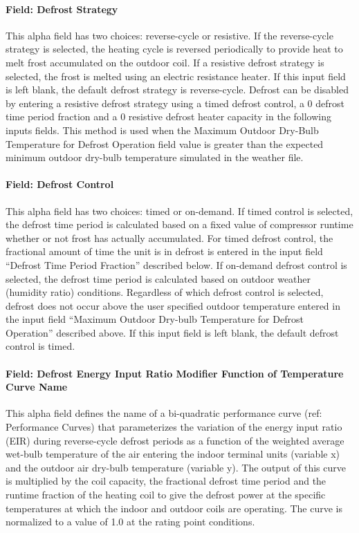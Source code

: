 \paragraph{Field: Defrost Strategy}

This alpha field has two choices: reverse-cycle or resistive. If the reverse-cycle strategy is selected, the heating cycle is reversed periodically to provide heat to melt frost accumulated on the outdoor coil. If a resistive defrost strategy is selected, the frost is melted using an electric resistance heater. If this input field is left blank, the default defrost strategy is reverse-cycle. Defrost can be disabled by entering a resistive defrost strategy using a timed defrost control, a 0 defrost time period fraction and a 0 resistive defrost heater capacity in the following inputs fields. This method is used when the Maximum Outdoor Dry-Bulb Temperature for Defrost Operation field value is greater than the expected minimum outdoor dry-bulb temperature simulated in the weather file.

\paragraph{Field: Defrost Control}

This alpha field has two choices: timed or on-demand. If timed control is selected, the defrost time period is calculated based on a fixed value of compressor runtime whether or not frost has actually accumulated. For timed defrost control, the fractional amount of time the unit is in defrost is entered in the input field ``Defrost Time Period Fraction'' described below. If on-demand defrost control is selected, the defrost time period is calculated based on outdoor weather (humidity ratio) conditions. Regardless of which defrost control is selected, defrost does not occur above the user specified outdoor temperature entered in the input field ``Maximum Outdoor Dry-bulb Temperature for Defrost Operation'' described above. If this input field is left blank, the default defrost control is timed.

\paragraph{Field: Defrost Energy Input Ratio Modifier Function of Temperature Curve Name}

This alpha field defines the name of a bi-quadratic performance curve (ref: Performance Curves) that parameterizes the variation of the energy input ratio (EIR) during reverse-cycle defrost periods as a function of the weighted average wet-bulb temperature of the air entering the indoor terminal units (variable x) and the outdoor air dry-bulb temperature (variable y). The output of this curve is multiplied by the coil capacity, the fractional defrost time period and the runtime fraction of the heating coil to give the defrost power at the specific temperatures at which the indoor and outdoor coils are operating. The curve is normalized to a value of 1.0 at the rating point conditions.

